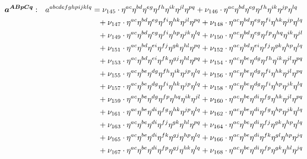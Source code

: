 \documentclass[a4paper,12pt, DIV=14, BCOR=5mm, twoside, headsepline, numbers=noenddot]{scrbook}
\begin{document}
\begin{align}\label{LorentzArea4}
\begin{alignedat}{2}
\boldsymbol{a^{ABpCq}}&: \ \ \ & a^{abcdefghpijklq}  &=
\nu_{145}\cdot\eta^{ac}\eta^{bd}\eta^{eg}\eta^{fh}\eta^{ik}\eta^{jl}\eta^{pq}+\nu_{146}\cdot\eta^{ac}\eta^{bd}\eta^{eg}\eta^{fh}\eta^{ik}\eta^{jp}\eta^{lq}\\
& & &\hphantom{=}
+\nu_{147}\cdot\eta^{ac}\eta^{bd}\eta^{eg}\eta^{fi}\eta^{hk}\eta^{jl}\eta^{pq}+\nu_{148}\cdot\eta^{ac}\eta^{bd}\eta^{eg}\eta^{fi}\eta^{hk}\eta^{jp}\eta^{lq}\\
& & &\hphantom{=}
+\nu_{149}\cdot\eta^{ac}\eta^{bd}\eta^{eg}\eta^{fi}\eta^{hp}\eta^{jk}\eta^{lq}+\nu_{150}\cdot\eta^{ac}\eta^{bd}\eta^{eg}\eta^{fp}\eta^{hq}\eta^{ik}\eta^{jl}\\
& & &\hphantom{=}
+\nu_{151}\cdot\eta^{ac}\eta^{bd}\eta^{ei}\eta^{fj}\eta^{gk}\eta^{hl}\eta^{pq}+\nu_{152}\cdot\eta^{ac}\eta^{bd}\eta^{ei}\eta^{fj}\eta^{gk}\eta^{hp}\eta^{lq}\\
& & &\hphantom{=}
+\nu_{153}\cdot\eta^{ac}\eta^{bd}\eta^{ei}\eta^{fk}\eta^{gj}\eta^{hl}\eta^{pq}+\nu_{154}\cdot\eta^{ac}\eta^{be}\eta^{dg}\eta^{fh}\eta^{ik}\eta^{jl}\eta^{pq}\\
& & &\hphantom{=}
+\nu_{155}\cdot\eta^{ac}\eta^{be}\eta^{dg}\eta^{fh}\eta^{ik}\eta^{jp}\eta^{lq}+\nu_{156}\cdot\eta^{ac}\eta^{be}\eta^{dg}\eta^{fi}\eta^{hk}\eta^{jl}\eta^{pq}\\
& & &\hphantom{=}
+\nu_{157}\cdot\eta^{ac}\eta^{be}\eta^{dg}\eta^{fi}\eta^{hk}\eta^{jp}\eta^{lq}+\nu_{158}\cdot\eta^{ac}\eta^{be}\eta^{dg}\eta^{fi}\eta^{hp}\eta^{jk}\eta^{lq}\\
& & &\hphantom{=}
+\nu_{159}\cdot\eta^{ac}\eta^{be}\eta^{dg}\eta^{fp}\eta^{hq}\eta^{ik}\eta^{jl}+\nu_{160}\cdot\eta^{ac}\eta^{be}\eta^{di}\eta^{fg}\eta^{hk}\eta^{jl}\eta^{pq}\\
& & &\hphantom{=}
+\nu_{161}\cdot\eta^{ac}\eta^{be}\eta^{di}\eta^{fg}\eta^{hk}\eta^{jp}\eta^{lq}+\nu_{162}\cdot\eta^{ac}\eta^{be}\eta^{di}\eta^{fg}\eta^{hp}\eta^{jk}\eta^{lq}\\
& & &\hphantom{=}
+\nu_{163}\cdot\eta^{ac}\eta^{be}\eta^{di}\eta^{fj}\eta^{gk}\eta^{hl}\eta^{pq}+\nu_{164}\cdot\eta^{ac}\eta^{be}\eta^{di}\eta^{fj}\eta^{gk}\eta^{hp}\eta^{lq}\\
& & &\hphantom{=}
+\nu_{165}\cdot\eta^{ac}\eta^{be}\eta^{di}\eta^{fk}\eta^{gj}\eta^{hp}\eta^{lq}+\nu_{166}\cdot\eta^{ac}\eta^{be}\eta^{di}\eta^{fk}\eta^{gl}\eta^{hp}\eta^{jq}\\
& & &\hphantom{=}
+\nu_{167}\cdot\eta^{ac}\eta^{be}\eta^{di}\eta^{fp}\eta^{gj}\eta^{hk}\eta^{lq}+\nu_{168}\cdot\eta^{ac}\eta^{be}\eta^{di}\eta^{fp}\eta^{gk}\eta^{hl}\eta^{jq}\\

\end{alignedat}
\end{align}
\end{document}
